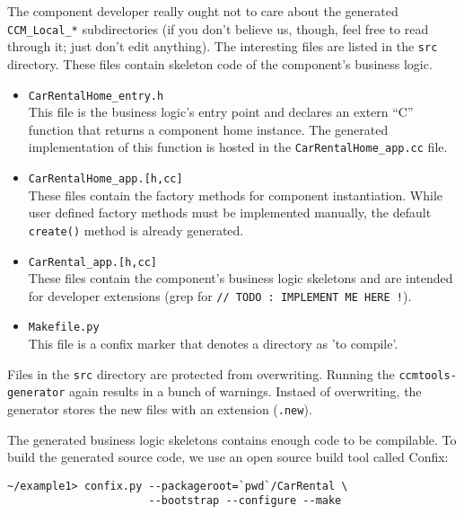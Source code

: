 The component developer really ought not to care about the generated {\tt CCM\_Local\_*}
subdirectories (if you don't believe us, though, feel free to read
through it; just don't edit anything). 
The interesting files are listed in the {\tt src} directory. These files contain skeleton
code of the component's business logic.

\begin{itemize}
\item {\tt CarRentalHome\_entry.h} \\
This file is the business logic's entry point and declares an extern ``C'' function 
that returns a component home instance.
The generated implementation of this function is hosted in the 
{\tt CarRentalHome\_app.cc} file.

\item {\tt CarRentalHome\_app.[h,cc]} \\
These files contain the factory methods for component instantiation. 
While user defined factory methods must be implemented manually, the default 
{\tt create()} method is already generated.

\item {\tt CarRental\_app.[h,cc]} \\
These files contain the component's business logic skeletons and are intended
for developer extensions (grep for {\tt // TODO : IMPLEMENT ME HERE !}).

\item {\tt Makefile.py} \\
This file is a confix marker that denotes a directory as 'to compile'.
\end{itemize}

Files in the {\tt src} directory are protected from overwriting.
Running the {\tt ccmtools-generator} again results in a bunch of warnings. 
Instaed of overwriting, the generator stores the new files with an extension ({\tt *.new}). 

\vspace{3mm}
The generated business logic skeletons contains enough code to be compilable.
To build the generated source code, we use an open source build tool called Confix:
\begin{small}
\begin{verbatim}
~/example1> confix.py --packageroot=`pwd`/CarRental \
                      --bootstrap --configure --make
\end{verbatim}
\end{small}


